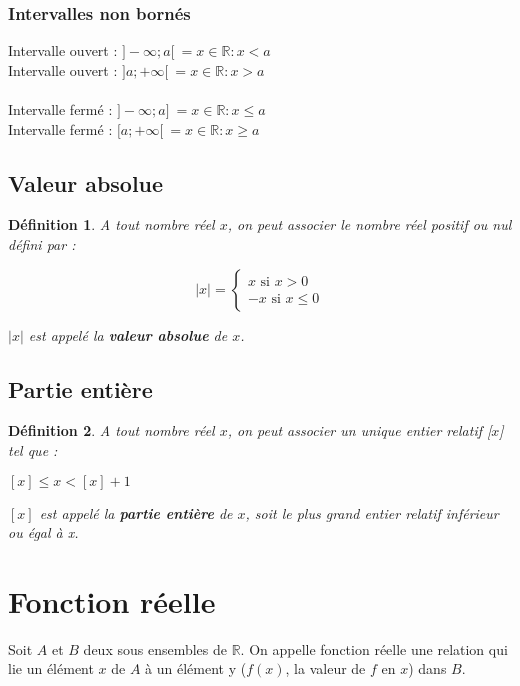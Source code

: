 \documentclass[12pt, a4paper]{book}
\newtheorem*{definition}{Définition}
\begin{document}
\subsubsection{Intervalles non bornés}
Intervalle ouvert : $]-\infty;a[ \ = ${$x \in \mathbb{R}:x<a$}\\
Intervalle ouvert : $]a ;+\infty[\ = ${$x \in \mathbb{R}:x>a$}\\
\newline \\
Intervalle fermé : $]-\infty;a] \ = ${$x \in \mathbb{R}:x\leq a$}\\
Intervalle fermé :  $[a ;+\infty[ \ = ${$x \in \mathbb{R}:x \geq a$}\\

\subsection{Valeur absolue}
\begin{definition}
    A tout nombre réel $x$, on peut associer le nombre réel positif ou nul défini par :
    \begin{center}
        $$\lvert x \rvert =
        \begin{cases}
            x \text{ si } x > 0\\
            -x \text{ si } x \leq 0
        \end{cases}
        $$
    \end{center}
$\lvert x \rvert$ est appelé la \textbf{valeur absolue} de $x$.
\end{definition}
\subsection{Partie entière}
\begin{definition}
    A tout nombre réel $x$, on peut associer un unique entier relatif [$x$] tel que :
    \begin{center}
        $[x] \leq x < [x]+1$
    \end{center}
    $[x]$ est appelé la \textbf{partie entière} de $x$, soit le plus grand entier relatif inférieur ou égal à x.
\end{definition}
\newpage
\section{Fonction réelle}
Soit $A$ et $B$ deux sous ensembles de $\mathbb{R}$. On appelle fonction réelle une relation qui lie un élément $x$ de $A$ à un élément y ($f(x)$, la valeur de $f$ en $x$) dans $B$.
\end{document}
